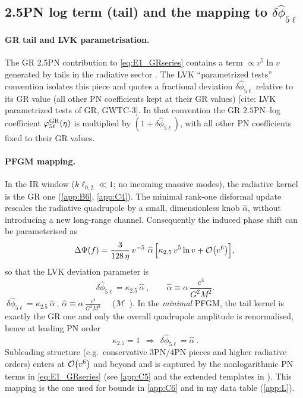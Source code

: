 \documentclass{iopjournal}
\begin{document}
\subsection{\texorpdfstring{2.5PN log term (tail) and the mapping to $\delta\hat\phi_{5\ell}$}{2.5PN log term (tail) and mapping to delta phihat 5 ell}}\label{app:E2}

\paragraph{GR tail and LVK parametrisation.}
The GR 2.5PN contribution to \eqref{eq:E1_GRseries} contains a term $\propto v^{5}\ln v$ generated by tails in the radiative sector \cite{Blanchet2014LRR}. The LVK ``parametrized tests'' convention isolates this piece and quotes a fractional deviation $\delta\hat\phi_{5\ell}$ relative to its GR value (all other PN coefficients kept at their GR values) [cite: LVK parametrized tests of GR, GWTC-3]. In that convention the GR $2.5$PN–log coefficient $\varphi_{5\ell}^{\rm GR}(\eta)$ is multiplied by $(1+\delta\hat\phi_{5\ell})$, with all other PN coefficients fixed to their GR values.

\paragraph{PFGM mapping.}
In the IR window ($k\ell_{0,2}\ll1$; no incoming massive modes), the radiative kernel is the GR one (\cref{app:B6}, \cref{app:C4}). The minimal rank-one disformal update rescales the radiative quadrupole by a small, dimensionless knob $\widehat\alpha$, without introducing a new long-range channel. Consequently the induced phase shift can be parameterised as
\begin{equation}
\Delta\Psi(f)=\frac{3}{128\,\eta}\,v^{-5}\ \widehat\alpha\,
\Big[\kappa_{2.5}\,v^{5}\ln v+\order{v^{6}}\Big],
\label{eq:E2_DeltaPsi}
\end{equation}
so that the LVK deviation parameter is
\begin{equation}
\boxed{\ \delta\hat\phi_{5\ell}=\kappa_{2.5}\,\widehat\alpha\ }\!,
\qquad
\widehat\alpha\equiv \alpha\,\frac{c^{4}}{G^{2}M^{2}}.
\label{eq:E2_map}
\end{equation}
$\boxed{\ \delta\hat\phi_{5\ell}=\kappa_{2.5}\,\widehat\alpha\ }\!$,
\qquad
$\widehat\alpha\equiv \alpha\,\frac{c^{4}}{G^{2}M^{2}}$
\ \ ($\mathcal{M}$\ ).
In the \emph{minimal} PFGM, the tail kernel is exactly the GR one and only the overall quadrupole amplitude is renormalised, hence at leading PN order
\begin{equation}
\boxed{\ \kappa_{2.5}=1\ \ \Rightarrow\ \ \delta\hat\phi_{5\ell}=\widehat\alpha\ } .
\label{eq:E2_kappa_one}
\end{equation}
Subleading structure (e.g.\ conservative 3PN/4PN pieces and higher radiative orders) enters at $\order{v^{6}}$ and beyond and is captured by the nonlogarithmic PN terms in \eqref{eq:E1_GRseries} (see \cref{app:C5} and the extended templates in ). This mapping is the one used for bounds in \cref{app:C6} and in my data table (\cref{app:L}). \cite{CutlerFlanagan1994,SathyaprakashSchutz2009,Blanchet2014LRR}
\end{document}
